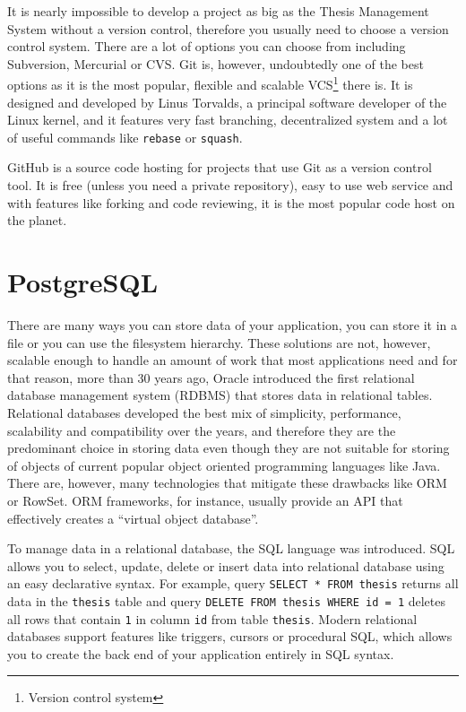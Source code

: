 It is nearly impossible to develop a project as big as the Thesis Management System without a version control, therefore you usually need to choose a version control system. There are a lot of options you can choose from including Subversion, Mercurial or CVS. Git is, however, undoubtedly one of the best options as it is the most popular, flexible and scalable VCS\footnote{Version control system} there is. It is designed and developed by Linus Torvalds, a principal software developer of the Linux kernel, and it features very fast branching, decentralized system and a lot of useful commands like \texttt{rebase} or \texttt{squash}\cite{git-homepage}\cite{pro-git}.

GitHub is a source code hosting for projects that use Git as a version control tool. It is free (unless you need a private repository), easy to use web service and with features like forking and code reviewing, it is the most popular code host on the planet\cite{github-features}.

\section{PostgreSQL}

There are many ways you can store data of your application, you can store it in a file or you can use the filesystem hierarchy. These solutions are not, however, scalable enough to handle an amount of work that most applications need and for that reason, more than 30 years ago, Oracle introduced the first relational database management system (RDBMS) that stores data in relational tables. Relational databases developed the best mix of simplicity, performance, scalability and compatibility over the years, and therefore they are the predominant choice in storing data even though they are not suitable for storing of objects of current popular object oriented programming languages like Java. There are, however, many technologies that mitigate these drawbacks like ORM or RowSet. ORM frameworks, for instance, usually provide an API that effectively creates a ``virtual object database''.

To manage data in a relational database, the SQL language was introduced. SQL allows you to select, update, delete or insert data into relational database using an easy declarative syntax. For example, query \texttt{SELECT * FROM thesis} returns all data in the \texttt{thesis} table and query \texttt{DELETE FROM thesis WHERE id = 1} deletes all rows that contain \texttt{1} in column \texttt{id} from table \texttt{thesis}. Modern relational databases support features like triggers, cursors or procedural SQL, which allows you to create the back end of your application entirely in SQL syntax.

